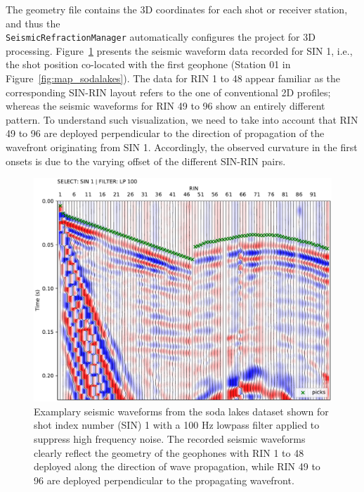 \documentclass[a4paper,fleqn]{cas-sc}
\begin{document}
The geometry file contains the 3D coordinates for each shot or receiver station, and thus the\\ \texttt{SeismicRefractionManager} %
automatically configures the project for 3D processing. 
Figure~\ref{fig:3d_pickwindow} presents the seismic waveform data recorded for SIN 1, i.e., the shot position co-located with the first geophone (Station 01 in Figure~\ref{fig:map_sodalakes}). The data for RIN 1 to 48 appear familiar as the corresponding SIN-RIN layout refers to the one of conventional 2D profiles; whereas the seismic waveforms for RIN 49 to 96 show an entirely different pattern. To understand such visualization, we need to take into account that RIN 49 to 96 are deployed perpendicular to the direction of propagation of the wavefront originating from SIN 1. Accordingly, the observed curvature in the first onsets is due to the varying offset of the different SIN-RIN pairs.

\begin{figure}
	\centering
	\includegraphics[width=.75\textwidth]{figures/sodalakes_sin1_lp100_picks_vd.pdf}
	\caption{Examplary seismic waveforms from the soda lakes dataset shown for shot index number (SIN) 1 with a 100 Hz lowpass filter applied to suppress high frequency noise. The recorded seismic waveforms clearly reflect the geometry of the geophones with RIN 1 to 48 deployed along the direction of wave propagation, while RIN 49 to 96 are deployed perpendicular to the propagating wavefront.}
	\label{fig:3d_pickwindow}
\end{figure}
\end{document}
